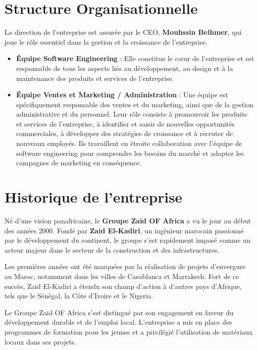 \documentclass[a4paper,11pt]{report}
\begin{document}
\section{Structure Organisationnelle}

La direction de l'entreprise est assurée par le CEO, \textbf{Mouhssin Belhmer}, qui joue le rôle essentiel dans la gestion et la croissance de l'entreprise.

\begin{itemize}
    \item \textbf{Équipe Software Engineering} : Elle constitue le cœur de l’entreprise et est responsable de tous les aspects liés au développement, au design et à la maintenance des produits et services de l'entreprise.
    \item \textbf{Équipe Ventes et Marketing / Administration} : Une équipe est spécifiquement responsable des ventes et du marketing, ainsi que de la gestion administrative et du personnel. Leur rôle consiste à promouvoir les produits et services de l’entreprise, à identifier et saisir de nouvelles opportunités commerciales, à développer des stratégies de croissance et à recruter de nouveaux employés. Ils travaillent en étroite collaboration avec l'équipe de software engineering pour comprendre les besoins du marché et adapter les campagnes de marketing en conséquence.
\end{itemize}

\section{Historique de l’entreprise}

Né d'une vision panafricaine, le \textbf{Groupe Zaid OF Africa} a vu le jour au début des années 2000. Fondé par \textbf{Zaid El-Kadiri}, un ingénieur marocain passionné par le développement du continent, le groupe s'est rapidement imposé comme un acteur majeur dans le secteur de la construction et des infrastructures.

Les premières années ont été marquées par la réalisation de projets d'envergure au Maroc, notamment dans les villes de Casablanca et Marrakech. Fort de ce succès, Zaid El-Kadiri a étendu son champ d'action à d’autres pays d'Afrique, tels que le Sénégal, la Côte d'Ivoire et le Nigeria.

Le Groupe Zaid OF Africa s'est distingué par son engagement en faveur du développement durable et de l'emploi local. L'entreprise a mis en place des programmes de formation pour les jeunes et a privilégié l'utilisation de matériaux locaux dans ses projets.
\end{document}
